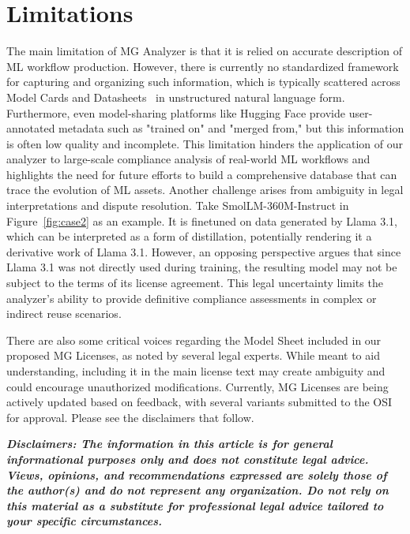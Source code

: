 \section{Limitations}
\label{apdx:disclamers}
The main limitation of MG Analyzer is that it is relied on accurate description of ML workflow production.
However, there is currently no standardized framework for capturing and organizing such information, which is typically scattered across Model Cards and Datasheets~\cite{biderman2022datasheet} in unstructured natural language form.
Furthermore, even model-sharing platforms like Hugging Face provide user-annotated metadata such as "trained on" and "merged from," but this information is often low quality and incomplete.
This limitation hinders the application of our analyzer to large-scale compliance analysis of real-world ML workflows and highlights the need for future efforts to build a comprehensive database that can trace the evolution of ML assets.
Another challenge arises from ambiguity in legal interpretations and dispute resolution. 
Take SmolLM-360M-Instruct in Figure~\ref{fig:case2} as an example. It is finetuned on data generated by Llama 3.1, which can be interpreted as a form of distillation, potentially rendering it a derivative work of Llama 3.1.
However, an opposing perspective argues that since Llama 3.1 was not directly used during training, the resulting model may not be subject to the terms of its license agreement.
This legal uncertainty limits the analyzer's ability to provide definitive compliance assessments in complex or indirect reuse scenarios.

There are also some critical voices regarding the Model Sheet included in our proposed MG Licenses, as noted by several legal experts.
While meant to aid understanding, including it in the main license text may create ambiguity and could encourage unauthorized modifications.
Currently, MG Licenses are being actively updated based on feedback, with several variants submitted to the OSI for approval.
Please see the disclaimers that follow.

\emph{\textbf{Disclaimers: The information in this article is for general informational purposes only and does not constitute legal advice. Views, opinions, and recommendations expressed are solely those of the author(s) and do not represent any organization. Do not rely on this material as a substitute for professional legal advice tailored to your specific circumstances.}}


